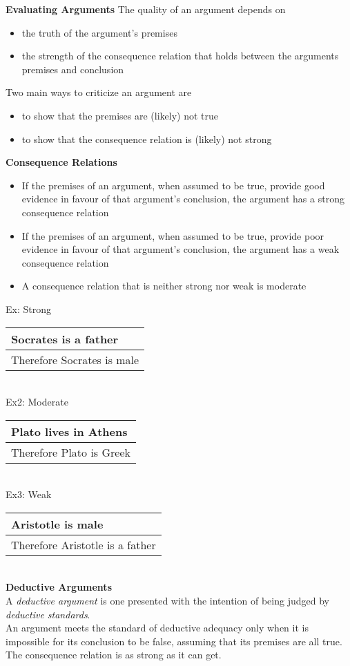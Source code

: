 \textbf{Evaluating Arguments}
The quality of an argument depends on
\begin{itemize}
    \item the truth of the argument's premises
    \item the strength of the consequence relation that holds between the arguments premises and conclusion
\end{itemize}
Two main ways to criticize an argument are
\begin{itemize}
    \item to show that the premises are (likely) not true
    \item to show that the consequence relation is (likely) not strong
\end{itemize}
\textbf{Consequence Relations}
\begin{itemize}
    \item If the premises of an argument, when assumed to be true, provide good evidence in favour of that argument's conclusion, the argument has a strong consequence relation
    \item If the premises of an argument, when assumed to be true, provide poor evidence in favour of that argument's conclusion, the argument has a weak consequence relation
    \item A consequence relation that is neither strong nor weak is moderate
\end{itemize}
Ex: Strong\\
\begin{tabular}{p{16cm}}
    Socrates is a father\\
    \hline
    Therefore Socrates is male
\end{tabular}\\
Ex2: Moderate\\
\begin{tabular}{p{16cm}}
Plato lives in Athens\\
\hline
Therefore Plato is Greek
\end{tabular}\\
Ex3: Weak\\
\begin{tabular}{p{16cm}}
Aristotle is male\\
\hline
Therefore Aristotle is a father
\end{tabular}\\

\textbf{Deductive Arguments}\\
A \textit{deductive argument} is one presented with the intention of being judged by \textit{deductive standards}.\\
An argument meets the standard of deductive adequacy only when it is impossible for its conclusion to be false, assuming that its premises are all true.\\
The consequence relation is as strong as it can get.\\

